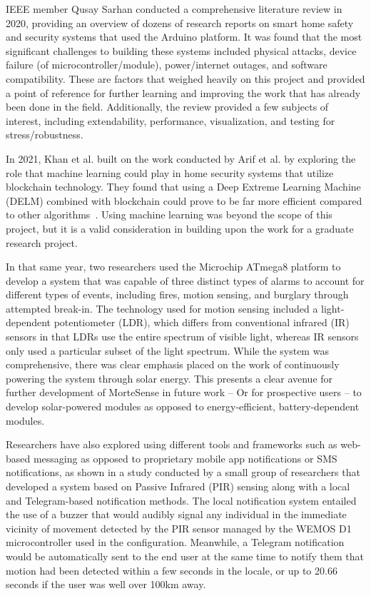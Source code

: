 IEEE member Qusay Sarhan conducted a comprehensive literature review in 2020, providing an
overview of dozens of research reports on smart home safety and security systems that
used the Arduino platform. It was found that the most significant challenges to building
these systems included physical attacks, device failure (of microcontroller/module),
power/internet outages, and software compatibility. These are factors that
weighed heavily on this project and provided a point of reference for further learning
and improving the work that has already been done in the field.
Additionally, the review provided a few subjects of interest, including extendability,
performance, visualization, and testing for stress/robustness. \cite{sarhan2020}

In 2021, Khan et al. built on the work conducted by Arif et al. by exploring the role that
machine learning could play in home security systems that utilize blockchain technology. They
found that using a Deep Extreme Learning Machine (DELM) combined with blockchain could prove
to be far more efficient compared to other algorithms~\cite{khanEtAl2021}. Using machine
learning was beyond the scope of this project, but it is a valid consideration in building
upon the work for a graduate research project.

In that same year, two researchers used the Microchip ATmega8 platform to develop a system
that was capable of three distinct types of alarms to account for different types of events,
including fires, motion sensing, and burglary through attempted break-in. The technology used
for motion sensing included a light-dependent potentiometer (LDR), which differs from
conventional infrared (IR) sensors in that LDRs use the entire spectrum of visible light,
whereas IR sensors only used a particular subset of the light spectrum. While the system was
comprehensive, there was clear emphasis placed on the work of continuously powering the
system through solar energy.\cite{chowdhuryAhmed2021} This presents a clear avenue for
further development of MorteSense in future work -- Or for prospective users -- to develop
solar-powered modules as opposed to energy-efficient, battery-dependent modules.

Researchers have also explored using different tools and frameworks such as web-based
messaging as opposed to proprietary mobile app notifications or SMS notifications, as shown in
a study conducted by a small group of researchers that developed a system based on Passive
Infrared (PIR) sensing along with a local and Telegram-based notification methods. The local
notification system entailed the use of a buzzer that would audibly signal any individual in
the immediate vicinity of movement detected by the PIR sensor managed by the WEMOS D1
microcontroller used in the configuration. Meanwhile, a Telegram notification would be
automatically sent to the end user at the same time to notify them that motion had been
detected within a few seconds in the locale, or up to 20.66 seconds if the user was well over
100km away. \cite{WahyuniEtAl2021}

